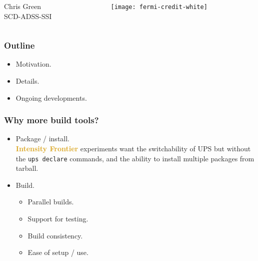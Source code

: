 \documentclass[xcolor={dvipsnames,table},c,compress,colorlinks]{beamer}
\newcommand{\cmd}[1]{\texttt{#1}\xspace}
\newcommand{\expt}[1]{\textbf{\textcolor{Goldenrod}{#1}}\xspace}
\newcommand{\IF}{\expt{Intensity Frontier}}
\begin{document}
\begin{frame}
\begin{columns}[onlytextwidth,b]
\begin{column}{0.3\textwidth}
    \end{column}
  \end{columns}
  \vspace{.3in}
  \begin{columns}[onlytextwidth,b]

    \begin{column}{0.45\textwidth}
      Chris Green \\
      SCD-ADSS-SSI
    \end{column}
    \begin{column}{0.55\textwidth}
      \hfill\mbox{\texttt{[image: fermi-credit-white]}} \\
    \end{column}
  \end{columns}
\end{frame}

\begin{frame}\frametitle{Outline}
  \begin{itemize}
  \item Motivation.
  \item Details.
  \item Ongoing developments.
  \end{itemize}
\end{frame}

\begin{frame}\frametitle{Why more build tools?}
  \begin{itemize}
  \item Package / install. \\
    \IF experiments want the switchability of UPS but without the \cmd{ups
    declare} commands, and the ability to install multiple packages from tarball.
  \item<2-> Build.
    \begin{itemize}
    \item<3-> Parallel builds.
    \item<4-> Support for testing.
    \item<5-> Build consistency.
    \item<6-> Ease of setup / use.
    \end{itemize}
  \end{itemize}
\end{frame}
\end{document}
